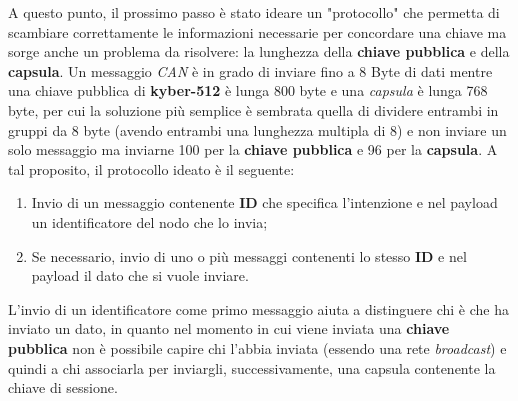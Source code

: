 A questo punto, il prossimo passo è stato ideare un "protocollo" che permetta di scambiare correttamente le informazioni necessarie per concordare una chiave ma sorge anche un problema da risolvere: la lunghezza della \textbf{chiave pubblica} e della \textbf{capsula}. Un messaggio \emph{CAN} è in grado di inviare fino a 8 Byte di dati mentre una chiave pubblica di \textbf{kyber-512} è lunga 800 byte e una \emph{capsula} è lunga 768 byte, per cui la soluzione più semplice è sembrata quella di dividere entrambi in gruppi da 8 byte (avendo entrambi una lunghezza multipla di 8) e non inviare un solo messaggio ma inviarne 100 per la \textbf{chiave pubblica} e 96 per la \textbf{capsula}. A tal proposito, il protocollo ideato è il seguente:
\begin{enumerate}
    \item Invio di un messaggio contenente \textbf{ID} che specifica l'intenzione e nel payload un identificatore del nodo che lo invia;
    \item Se necessario, invio di uno o più messaggi contenenti lo stesso \textbf{ID} e nel payload il dato che si vuole inviare.
\end{enumerate}

L'invio di un identificatore come primo messaggio aiuta a distinguere chi è che ha inviato un dato, in quanto nel momento in cui viene inviata una \textbf{chiave pubblica} non è possibile capire chi l'abbia inviata (essendo una rete \emph{broadcast}) e quindi a chi associarla per inviargli, successivamente, una capsula contenente la chiave di sessione.

